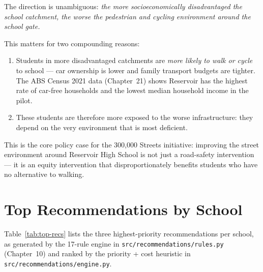 \documentclass[11pt,a4paper,openany]{book}
\begin{document}
The direction is unambiguous: \emph{the more socioeconomically disadvantaged the school
catchment, the worse the pedestrian and cycling environment around the school gate.}

This matters for two compounding reasons:

\begin{enumerate}
  \item Students in more disadvantaged catchments are \emph{more likely to walk or
    cycle} to school --- car ownership is lower and family transport budgets are tighter.
    The ABS Census 2021 data (Chapter~21) shows Reservoir has the highest rate of
    car-free households and the lowest median household income in the pilot.
  \item These students are therefore more exposed to the worse infrastructure: they
    depend on the very environment that is most deficient.
\end{enumerate}

This is the core policy case for the 300,000 Streets initiative: improving the street
environment around Reservoir High School is not just a road-safety intervention --- it
is an equity intervention that disproportionately benefits students who have no
alternative to walking.

\section{Top Recommendations by School}

Table~\ref{tab:top-recs} lists the three highest-priority recommendations per school,
as generated by the 17-rule engine in \texttt{src/recommendations/rules.py} (Chapter~10)
and ranked by the priority + cost heuristic in \texttt{src/recommendations/engine.py}.
\end{document}
